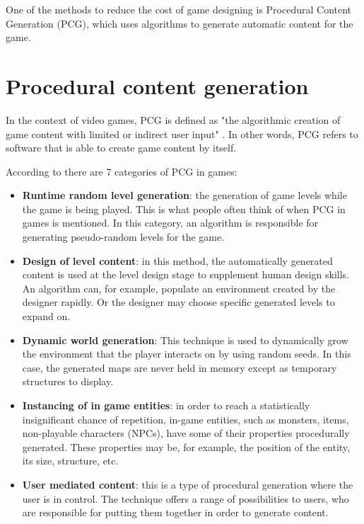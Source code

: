 One of the methods to reduce the cost of game designing is Procedural Content Generation (PCG), which uses algorithms to generate automatic content for the game.

\section{Procedural content generation}
\label{sec:pcg}

In the context of video games, PCG is defined as "the algorithmic creation of game content with
limited or indirect user input" \cite{togelius:2011}. In other words, PCG refers to software that is able to create game content by itself.

According to \textcite{doull:2008} there are 7 categories of PCG in games:

\begin{itemize}
\item \textbf{Runtime random level generation}: the generation of game levels while the game is being played. This is what people often think of when PCG in games is mentioned. In this category, an algorithm is responsible for generating pseudo-random levels for the game.

\item \textbf{Design of level content}: in this method, the automatically generated content is used at the level design stage to supplement human design skills. An algorithm can, for example, populate an environment created by the designer rapidly. Or the designer may choose specific generated levels to expand on.

\item \textbf{Dynamic world generation}: This technique is used to dynamically grow the environment that the player interacts on by using random seeds. In this case, the generated maps are never held in memory except as temporary structures to display.

\item \textbf{Instancing of in game entities}: in order to reach a statistically insignificant chance of repetition, in-game entities, such as monsters, items, non-playable characters (NPCs), have some of their properties procedurally generated. These properties may be, for example, the position of the entity, its size, structure, etc.

\item \textbf{User mediated content}: this is a type of procedural generation where the user is in control. The technique offers a range of possibilities to users, who are responsible for putting them together in order to generate content.


\end{itemize}
